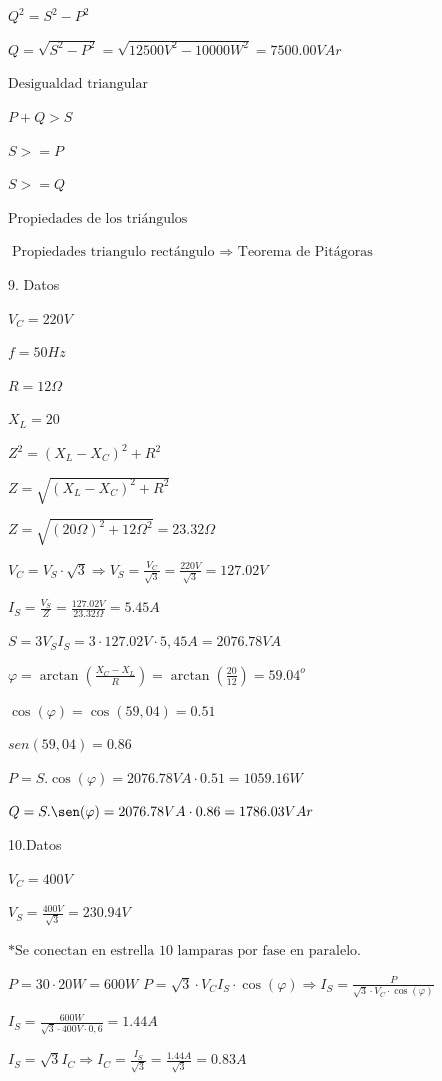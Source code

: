 \documentclass[../main]{subfiles}
\begin{document}
$Q^2=S^2-P^2$

$Q=\sqrt{S^2-P^2}=\sqrt{12500V^2-10000W^2} = 7500.00VAr$

$\text{Desigualdad triangular}$

$P+Q>S$

$S>=P$

$S>=Q$

$\text{Propiedades de los triángulos}$

$\text{Propiedades triangulo rectángulo $\Rightarrow$ Teorema de Pitágoras}$

\vspace{1cm}

9. Datos

$V_C=220V$

$f=50Hz$

$R=12 \Omega$

$X_L=20$

$Z^2={(X_L-X_C)}^2+R^2 $

$Z=\sqrt{{(X_L-X_C)}^2+R^2} $

$Z=\sqrt{{(20\Omega)}^2+12\Omega^2} = 23.32\Omega$

$V_C=V_S \cdot \sqrt{3}\Rightarrow V_S=\frac{V_C}{ \sqrt{3}}
=\frac{220V}{\sqrt{3}}=127.02V$

$I_S=\frac{V_S}{Z}=\frac{127.02V}{23.32\Omega}=5.45A$

$S=3 V_S I_S=3 \cdot 127.02V \cdot 5,45A=2076.78VA$

$\varphi = \arctan(\frac{X_C-X_L}{R})= \arctan(\frac{20}{12})=59.04^o$

$\cos(\varphi) = \cos(59,04)=0.51$

$sen(59,04)=0.86$

$P=S.\cos(\varphi)=2076.78VA \cdot 0.51=1059.16W$

$Q=S.\sen(\varphi)=2076.78VA \cdot 0.86=1786.03VAr$

\vspace{1cm}

10.Datos

$V_C=400V$

$V_S=\frac{400V}{\sqrt{3}}=230.94V$

$* \text{Se conectan en estrella 10 lamparas por fase en paralelo.}$

$P=30 \cdot 20W=600W $
$P=\sqrt{3}\cdot V_C I_S \cdot \cos(\varphi)\Rightarrow
I_S=\frac{P}{\sqrt{3}\cdot V_C \cdot \cos(\varphi)}$

$I_S=\frac{600W}{\sqrt{3}\cdot 400V \cdot 0,6}=1.44A$

$I_S=\sqrt{3} I_C \Rightarrow
I_C=\frac{I_S}{\sqrt{3}}=\frac{1.44A}{\sqrt{3}}=0.83A$
\end{document}
